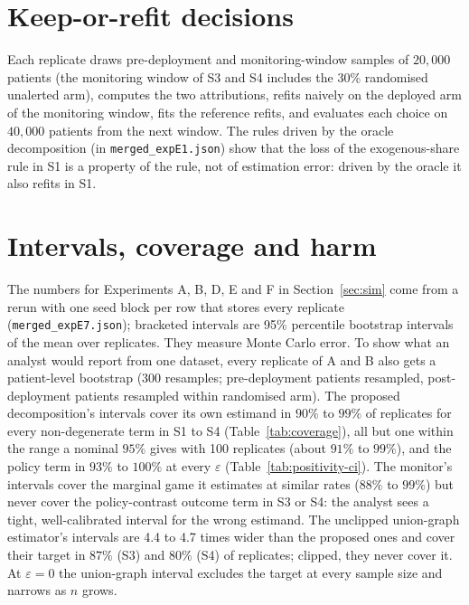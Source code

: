 \documentclass[letterpaper]{article} %
\begin{document}
\section{Keep-or-refit decisions}
\label{app:decision}
Each replicate draws pre-deployment and monitoring-window samples of $20{,}000$
patients (the monitoring window of S3 and S4 includes the $30\%$ randomised
unalerted arm), computes the two attributions, refits naively on the deployed
arm of the monitoring window, fits the reference refits, and evaluates each
choice on $40{,}000$ patients from the next window. The rules driven by the
oracle decomposition (in \texttt{merged\_expE1.json}) show that the loss of the
exogenous-share rule in S1 is a property of the rule, not of estimation error:
driven by the oracle it also refits in S1.



\section{Intervals, coverage and harm}
\label{app:intervals}
The numbers for Experiments A, B, D, E and F in Section~\ref{sec:sim} come
from a rerun with one seed block per row that stores every replicate
(\texttt{merged\_expE7.json}); bracketed intervals are 95\% percentile
bootstrap intervals of the mean over replicates. They measure Monte Carlo
error. To show what an analyst would report from one dataset, every replicate
of A and B also gets a patient-level bootstrap (300 resamples;
pre-deployment patients resampled, post-deployment patients resampled within
randomised arm). The proposed decomposition's intervals cover its own estimand in $90\%$ to $99\%$ of replicates for every non-degenerate term in S1 to S4 (Table~\ref{tab:coverage}), all but one within the range a nominal $95\%$ gives with 100 replicates (about $91\%$ to $99\%$), and the policy term in $93\%$ to $100\%$ at every $\varepsilon$ (Table~\ref{tab:positivity-ci}). The monitor's intervals cover the marginal game it estimates at similar rates ($88\%$ to $99\%$) but never cover the policy-contrast outcome term in S3 or S4: the analyst sees a tight, well-calibrated interval for the wrong estimand. The unclipped union-graph estimator's intervals are 4.4 to 4.7 times wider than the proposed ones and cover their target in $87\%$ (S3) and $80\%$ (S4) of replicates; clipped, they never cover it. At $\varepsilon = 0$ the union-graph interval excludes the target at every sample size and narrows as $n$ grows.
\end{document}
